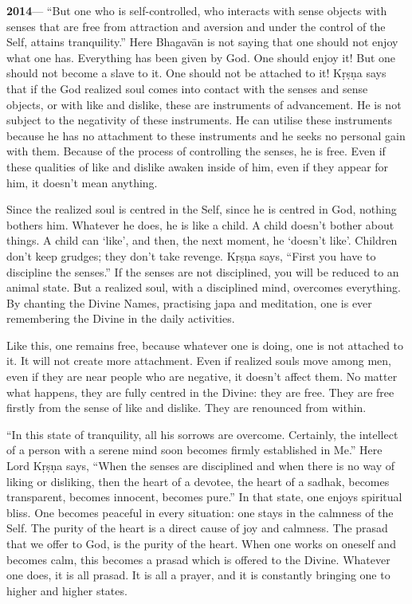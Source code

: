 \textbf{2014}--- “But one who is self-controlled, who interacts with sense objects with senses that are free from attraction and aversion and under the control of the Self, attains tranquility.” Here Bhagavān is not saying that one should not enjoy what one has. Everything has been given by God. One should enjoy it! But one should not become a slave to it. One should not be attached to it! Kṛṣṇa says that if the God realized soul comes into contact with the senses and sense objects, or with like and dislike, these are instruments of advancement. He is not subject to the negativity of these instruments. He can utilise these instruments because he has no attachment to these instruments and he seeks no personal gain with them. Because of the process of controlling the senses, he is free. Even if these qualities of like and dislike awaken inside of him, even if they appear for him, it doesn’t mean anything.

Since the realized soul is centred in the Self, since he is centred in God, nothing bothers him. Whatever he does, he is like a child. A child doesn’t bother about things. A child can ‘like’, and then, the next moment, he ‘doesn’t like’. Children don’t keep grudges; they don’t take revenge. Kṛṣṇa says, “First you have to discipline the senses.” If the senses are not disciplined, you will be reduced to an animal state. But a realized soul, with a disciplined mind, overcomes everything. By chanting the Divine Names, practising japa and meditation, one is ever remembering the Divine in the daily activities.

Like this, one remains free, because whatever one is doing, one is not attached to it. It will not create more attachment. Even if realized souls move among men, even if they are near people who are negative, it doesn’t affect them. No matter what happens, they are fully centred in the Divine: they are free. They are free firstly from the sense of like and dislike. They are renounced from within.

“In this state of tranquility, all his sorrows are overcome. Certainly, the intellect of a person with a serene mind soon becomes firmly established in Me.” Here Lord Kṛṣṇa says, “When the senses are disciplined and when there is no way of liking or disliking, then the heart of a devotee, the heart of a sadhak, becomes transparent, becomes innocent, becomes pure.” In that state, one enjoys spiritual bliss. One becomes peaceful in every situation: one stays in the calmness of the Self. The purity of the heart is a direct cause of joy and calmness. The prasad that we offer to God, is the purity of the heart. When one works on oneself and becomes calm, this becomes a prasad which is offered to the Divine. Whatever one does, it is all prasad. It is all a prayer, and it is constantly bringing one to higher and higher states.


